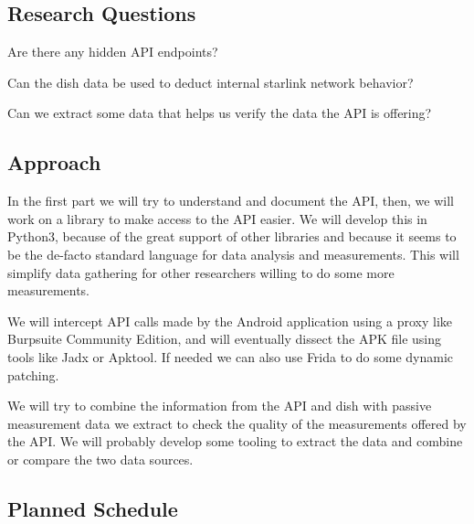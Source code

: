 \documentclass[NET,a4paper,12pt,english]{netforms}
\begin{document}
\subsection*{Research Questions}
\begin{researchquestions}
\item Are there any hidden API endpoints?
\item Can the dish data be used to deduct internal starlink network behavior?
\item Can we extract some data that helps us verify the data the API is offering?
\end{researchquestions}

\subsection*{Approach}
In the first part we will try to understand and document the API, then, we will work on a library to make access to the API easier.
We will develop this in Python3, because of the great support of other libraries and because it seems to be the de-facto standard language
for data analysis and measurements. This will simplify data gathering for other researchers willing to do some more measurements.

We will intercept API calls made by the Android application using a proxy like Burpsuite Community Edition, and will eventually dissect the APK file
using tools like Jadx or Apktool. If needed we can also use Frida to do some dynamic patching.

We will try to combine the information from the API and dish with passive measurement data we extract to check the quality of the measurements offered by the API. We will probably develop some tooling to extract the data and combine or compare the two data sources.


\subsection*{Planned Schedule}
\end{document}
